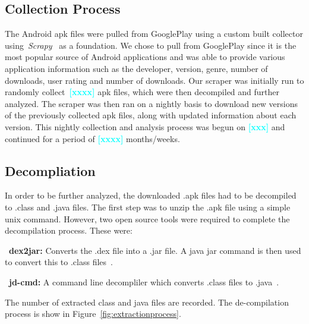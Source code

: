 \documentclass{sig-alternate}
\newcommand{\todo}[1]{\textcolor{cyan}{\textbf{[#1]}}}
\begin{document}
\label{sec: collection}
\subsection{Collection Process}

The Android apk files were pulled from GooglePlay using a custom built collector using~\emph{Scrapy}~\cite{scrapy_URL} as a foundation. We chose to pull from GooglePlay since it is the most popular source of Android applications and was able to provide various application information such as the developer, version, genre, number of downloads, user rating and number of downloads. Our scraper was initially run to randomly collect~\todo{xxxx} apk files, which were then decompiled and further analyzed. The scraper was then ran on a nightly basis to download new versions of the previously collected apk files, along with updated information about each version. This nightly collection and analysis process was begun on \todo{xxx} and continued for a period of \todo{xxxx} months/weeks.

\subsection{Decompliation}
\label{sec: decompliation}

In order to be further analyzed, the downloaded .apk files had to be decompiled to .class and .java files. The first step was to unzip the .apk file using a simple unix command. However, two open source tools were required to complete the decompilation process. These were:
 \begin{description}
    \item~\textbf{dex2jar:} Converts the .dex file into a .jar file. A java jar command is then used to convert this to .class files~\cite{dex2jar_key}.
    \item~\textbf{jd-cmd:} A command line decompliler which converts .class files to .java~\cite{jdcmd_key}.
\end{description}

The number of extracted class and java files are recorded. The de-compilation process is show in Figure~\ref{fig:extractionprocess}.
\end{document}
